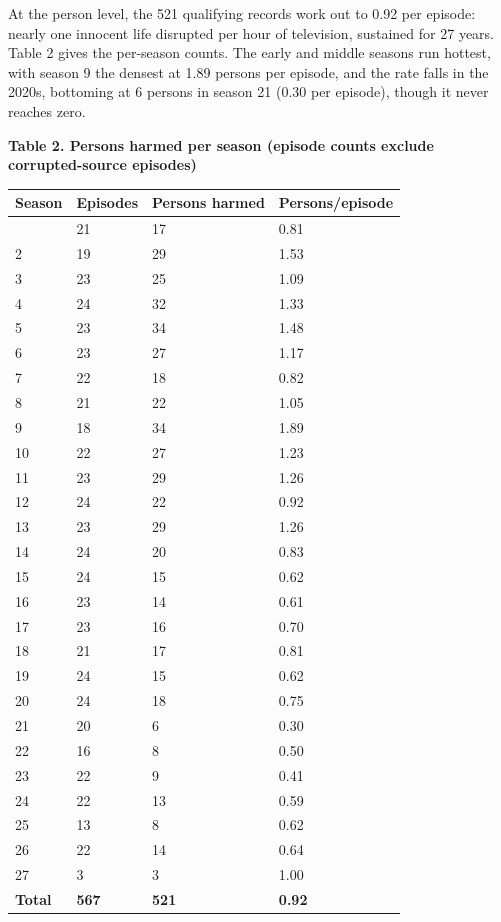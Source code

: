 \documentclass[
]{article}
\newcounter{none} %
\begin{document}
At the person level, the 521 qualifying records work out to 0.92 per
episode: nearly one innocent life disrupted per hour of television,
sustained for 27 years. Table 2 gives the per-season counts. The early
and middle seasons run hottest, with season 9 the densest at 1.89
persons per episode, and the rate falls in the 2020s, bottoming at 6
persons in season 21 (0.30 per episode), though it never reaches zero.

\textbf{Table 2. Persons harmed per season (episode counts exclude
corrupted-source episodes)}

{\def\LTcaptype{none} %
\begin{longtable}[]{@{}llll@{}}
\toprule\noalign{}
Season & Episodes & Persons harmed & Persons/episode \\
\midrule\noalign{}
\endhead
\bottomrule\noalign{}
\endlastfoot
1 & 21 & 17 & 0.81 \\
2 & 19 & 29 & 1.53 \\
3 & 23 & 25 & 1.09 \\
4 & 24 & 32 & 1.33 \\
5 & 23 & 34 & 1.48 \\
6 & 23 & 27 & 1.17 \\
7 & 22 & 18 & 0.82 \\
8 & 21 & 22 & 1.05 \\
9 & 18 & 34 & 1.89 \\
10 & 22 & 27 & 1.23 \\
11 & 23 & 29 & 1.26 \\
12 & 24 & 22 & 0.92 \\
13 & 23 & 29 & 1.26 \\
14 & 24 & 20 & 0.83 \\
15 & 24 & 15 & 0.62 \\
16 & 23 & 14 & 0.61 \\
17 & 23 & 16 & 0.70 \\
18 & 21 & 17 & 0.81 \\
19 & 24 & 15 & 0.62 \\
20 & 24 & 18 & 0.75 \\
21 & 20 & 6 & 0.30 \\
22 & 16 & 8 & 0.50 \\
23 & 22 & 9 & 0.41 \\
24 & 22 & 13 & 0.59 \\
25 & 13 & 8 & 0.62 \\
26 & 22 & 14 & 0.64 \\
27 & 3 & 3 & 1.00 \\
\textbf{Total} & \textbf{567} & \textbf{521} & \textbf{0.92} \\
\end{longtable}
}
\end{document}
